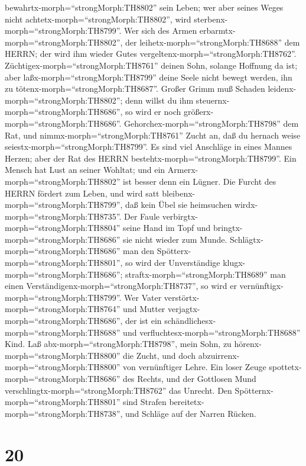 bewahrtx-morph=``strongMorph:TH8802'' sein Leben; wer aber seines Weges
nicht achtetx-morph=``strongMorph:TH8802'', wird
sterbenx-morph=``strongMorph:TH8799''.  Wer sich des Armen
erbarmtx-morph=``strongMorph:TH8802'', der
leihetx-morph=``strongMorph:TH8688'' dem HERRN; der wird ihm wieder
Gutes vergeltenx-morph=``strongMorph:TH8762''. 
Züchtigex-morph=``strongMorph:TH8761'' deinen Sohn, solange Hoffnung da
ist; aber laßx-morph=``strongMorph:TH8799'' deine Seele nicht bewegt
werden, ihn zu tötenx-morph=``strongMorph:TH8687''.  Großer
Grimm muß Schaden leidenx-morph=``strongMorph:TH8802''; denn willst du
ihm steuernx-morph=``strongMorph:TH8686'', so wird er noch
größerx-morph=``strongMorph:TH8686''. 
Gehorchex-morph=``strongMorph:TH8798'' dem Rat, und
nimmx-morph=``strongMorph:TH8761'' Zucht an, daß du hernach weise
seiestx-morph=``strongMorph:TH8799''.  Es sind viel
Anschläge in eines Mannes Herzen; aber der Rat des HERRN
bestehtx-morph=``strongMorph:TH8799''.  Ein Mensch hat Lust
an seiner Wohltat; und ein Armerx-morph=``strongMorph:TH8802'' ist
besser denn ein Lügner.  Die Furcht des HERRN fördert zum
Leben, und wird satt bleibenx-morph=``strongMorph:TH8799'', daß kein
Übel sie heimsuchen wirdx-morph=``strongMorph:TH8735''. 
Der Faule verbirgtx-morph=``strongMorph:TH8804'' seine Hand im Topf und
bringtx-morph=``strongMorph:TH8686'' sie nicht wieder zum Munde.
 Schlägtx-morph=``strongMorph:TH8686'' man den
Spötterx-morph=``strongMorph:TH8801'', so wird der Unverständige
klugx-morph=``strongMorph:TH8686''; straftx-morph=``strongMorph:TH8689''
man einen Verständigenx-morph=``strongMorph:TH8737'', so wird er
vernünftigx-morph=``strongMorph:TH8799''.  Wer Vater
verstörtx-morph=``strongMorph:TH8764'' und Mutter
verjagtx-morph=``strongMorph:TH8686'', der ist ein
schändlichesx-morph=``strongMorph:TH8688'' und
verfluchtesx-morph=``strongMorph:TH8688'' Kind.  Laß
abx-morph=``strongMorph:TH8798'', mein Sohn, zu
hörenx-morph=``strongMorph:TH8800'' die Zucht, und doch
abzuirrenx-morph=``strongMorph:TH8800'' von vernünftiger Lehre.
 Ein loser Zeuge spottetx-morph=``strongMorph:TH8686'' des
Rechts, und der Gottlosen Mund verschlingtx-morph=``strongMorph:TH8762''
das Unrecht.  Den Spötternx-morph=``strongMorph:TH8801''
sind Strafen bereitetx-morph=``strongMorph:TH8738'', und Schläge auf der
Narren Rücken.

\hypertarget{section-19}{%
\section{20}\label{section-19}}


